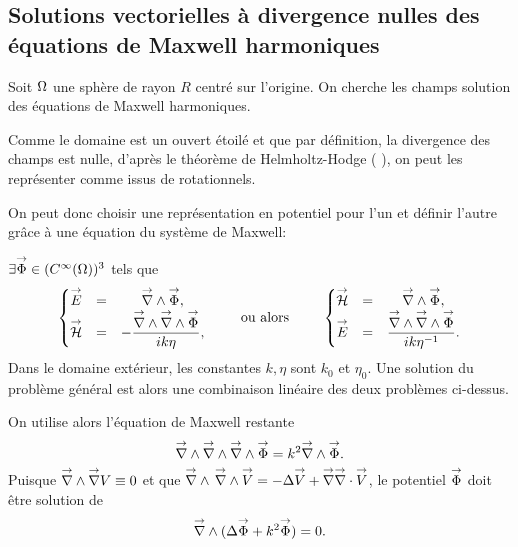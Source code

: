 \subsection{Solutions vectorielles à divergence nulles des équations de Maxwell harmoniques}
\label{sec:sol_maxwell}


Soit \(\Omega\) une sphère de rayon \(R\) centré sur l'origine. On cherche les champs solution des équations de Maxwell harmoniques.

Comme le domaine est un ouvert étoilé et que par définition, la divergence des champs est nulle, d'après le théorème de Helmholtz-Hodge ( \cite{gui_rigorous_2007} ), on peut les représenter comme issus de rotationnels.


On peut donc choisir une représentation en potentiel pour l'un et définir l'autre grâce à une équation du système de Maxwell:


 \(\exists {\overset{\rightarrow}{\Phi}} \in (C^\infty(\Omega))^3\) tels que
\begin{equation}
  \label{eq:sol_maxwell:pot_hertz}
  \left\lbrace\begin{matrix}
    \vE &=& \vrot \vect \Phi,
    \\
    \vH &=& - \frac{\vrot \vrot \vect \Phi}{ik\eta},
  \end{matrix} \right.
  \qquad \text{ ou alors } \qquad
  \left\lbrace\begin{matrix}
    \vH &=& \vrot \vect \Phi,
    \\
    \vE &=& \frac{\vrot \vrot \vect \Phi}{ik\eta^{-1}}.
  \end{matrix}\right.
\end{equation}
Dans le domaine extérieur, les constantes \(k,\eta\) sont \(k_0\) et \(\eta_0\).
Une solution du problème général est alors une combinaison linéaire des deux problèmes ci-dessus.

On utilise alors l'équation de Maxwell restante
\[
    {\overset{\rightarrow}{\nabla}}\wedge {\overset{\rightarrow}{\nabla}}\wedge {\overset{\rightarrow}{\nabla}}\wedge {\overset{\rightarrow}{\Phi}} = k^2 {\overset{\rightarrow}{\nabla}}\wedge {\overset{\rightarrow}{\Phi}}.
\]
Puisque \({\overset{\rightarrow}{\nabla}}\wedge  {\overset{\rightarrow}{\nabla}}  V  \equiv 0\) et que \({\overset{\rightarrow}{\nabla}}\wedge\, {\overset{\rightarrow}{\nabla}}\wedge {\overset{\rightarrow}{V}} = -\Delta {\overset{\rightarrow}{V}} + {\overset{\rightarrow}{\nabla}} {\overset{\rightarrow}{\nabla}}\cdot {\overset{\rightarrow}{V}}\), le potentiel \({\overset{\rightarrow}{\Phi}}\) doit être solution de
\begin{equation}
  \label{eq:sol_maxwell:helmholtz_vect}
  \vrot ( \lapl \vect \Phi + k^2 \vect \Phi ) = 0.
\end{equation}

